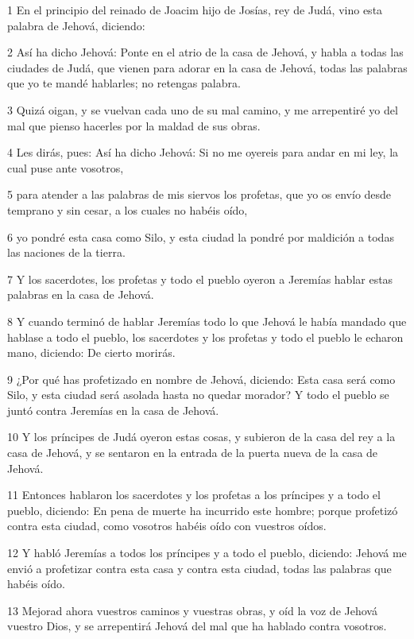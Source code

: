 \par 1 En el principio del reinado de Joacim hijo de Josías, rey de Judá, vino esta palabra de Jehová, diciendo:
\par 2 Así ha dicho Jehová: Ponte en el atrio de la casa de Jehová, y habla a todas las ciudades de Judá, que vienen para adorar en la casa de Jehová, todas las palabras que yo te mandé hablarles; no retengas palabra.
\par 3 Quizá oigan, y se vuelvan cada uno de su mal camino, y me arrepentiré yo del mal que pienso hacerles por la maldad de sus obras.
\par 4 Les dirás, pues: Así ha dicho Jehová: Si no me oyereis para andar en mi ley, la cual puse ante vosotros,
\par 5 para atender a las palabras de mis siervos los profetas, que yo os envío desde temprano y sin cesar, a los cuales no habéis oído,
\par 6 yo pondré esta casa como Silo, y esta ciudad la pondré por maldición a todas las naciones de la tierra.
\par 7 Y los sacerdotes, los profetas y todo el pueblo oyeron a Jeremías hablar estas palabras en la casa de Jehová.
\par 8 Y cuando terminó de hablar Jeremías todo lo que Jehová le había mandado que hablase a todo el pueblo, los sacerdotes y los profetas y todo el pueblo le echaron mano, diciendo: De cierto morirás.
\par 9 ¿Por qué has profetizado en nombre de Jehová, diciendo: Esta casa será como Silo, y esta ciudad será asolada hasta no quedar morador? Y todo el pueblo se juntó contra Jeremías en la casa de Jehová.
\par 10 Y los príncipes de Judá oyeron estas cosas, y subieron de la casa del rey a la casa de Jehová, y se sentaron en la entrada de la puerta nueva de la casa de Jehová.
\par 11 Entonces hablaron los sacerdotes y los profetas a los príncipes y a todo el pueblo, diciendo: En pena de muerte ha incurrido este hombre; porque profetizó contra esta ciudad, como vosotros habéis oído con vuestros oídos.
\par 12 Y habló Jeremías a todos los príncipes y a todo el pueblo, diciendo: Jehová me envió a profetizar contra esta casa y contra esta ciudad, todas las palabras que habéis oído.
\par 13 Mejorad ahora vuestros caminos y vuestras obras, y oíd la voz de Jehová vuestro Dios, y se arrepentirá Jehová del mal que ha hablado contra vosotros.
